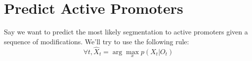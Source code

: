\documentclass[a4 paper]{article}
\begin{document}
\section{Predict Active Promoters}
Say we want to predict the most likely segmentation to active promoters given a sequence of modifications. We’ll try to use the following rule:
\[
\forall t, \hat{X}_t = \arg \max_x p(X_t | O_t)
\]



\end{document}
